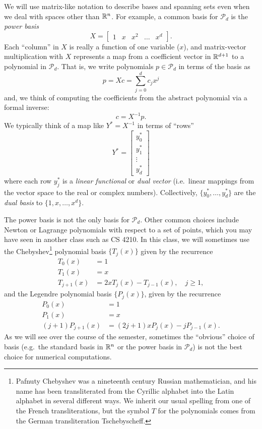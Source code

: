 \documentclass[12pt, leqno]{article} %
\begin{document}
We will use matrix-like notation to describe bases and spanning sets
even when we deal with spaces other than $\mathbb{R}^n$.  For example, a
common basis for $\mathcal{P}_d$ is the {\em power basis}
\[
  X = \begin{bmatrix} 1 & x & x^2 & \ldots & x^d \end{bmatrix}.
\]
Each ``column'' in $X$ is really a function of one variable ($x$), and
matrix-vector multiplication with $X$ represents a map from a
coefficient vector in $\mathbb{R}^{d+1}$ to a polynomial in $\mathcal{P}_d$.
That is, we write polynomials $p \in \mathcal{P}_d$ in terms of the
basis as
\[
  p = Xc = \sum_{j=0}^d c_j x^j
\]
and, we think of computing the coefficients from the
abstract polynomial via a formal inverse:
\[
  c = X^{-1} p.
\]
We typically think of a map like $Y^* = X^{-1}$ in terms of ``rows''
\[
  Y^* = \begin{bmatrix} y_0^* \\ y_1^* \\ \vdots \\ y_d^* \end{bmatrix}
\]
where each row $y_j^*$ is a {\em linear functional} or {\em dual
  vector} (i.e.~linear mappings from the vector space to the real or
complex numbers).  Collectively, $\{y_0^*, \ldots, y_d^*\}$ are the
{\em dual basis} to $\{1, x, \ldots, x^d\}$.

The power basis is not the only basis for $\mathcal{P}_d$.  Other
common choices include Newton or Lagrange polynomials with respect to
a set of points, which you may have seen in another class such as CS
4210.  In this class, we will sometimes use the Chebyshev\footnote{
  Pafnuty Chebyshev %
  was a nineteenth century Russian
  mathematician, and his name has been transliterated from the
  Cyrillic alphabet into the Latin alphabet in several different ways.
  We inherit our usual spelling from one of the French
  transliterations, but the symbol $T$ for the polynomials comes from
  the German transliteration Tschebyscheff.  } polynomial basis $\{
T_j(x) \}$ given by the recurrence
\begin{align*}
  T_0(x) &= 1 \\
  T_1(x) &= x \\
  T_{j+1}(x) &= 2 x T_{j}(x) - T_{j-1}(x), \quad j \geq 1,
\end{align*}
and the Legendre polynomial basis
$\{ P_j(x) \}$, given by the recurrence
\begin{align*}
  P_0(x) &= 1 \\
  P_1(x) &= x \\
  (j+1) P_{j+1}(x) &= (2j+1) x P_j(x) - j P_{j-1}(x).
\end{align*}
As we will see over the course of the semester, sometimes the
``obvious'' choice of basis (e.g.~the standard basis in $\mathbb{R}^n$ or
the power basis in $\mathcal{P}_d$) is not the best choice for
numerical computations.
\end{document}
